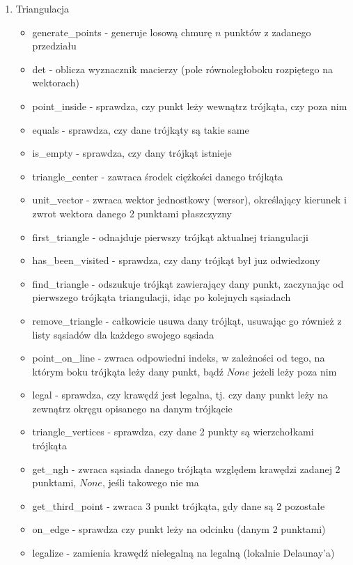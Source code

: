 \documentclass{article}
\begin{document}
\begin{enumerate}
    \item Triangulacja
    \begin{itemize}
        \item generate\_points - generuje losową chmurę $n$ punktów z zadanego przedziału
        \item det - oblicza wyznacznik macierzy (pole równoległoboku rozpiętego na wektorach)
        \item point\_inside - sprawdza, czy punkt leży wewnątrz trójkąta, czy poza nim 
        \item equals - sprawdza, czy dane trójkąty są takie same
        \item is\_empty - sprawdza, czy dany trójkąt istnieje
        \item triangle\_center - zawraca środek ciężkości danego trójkąta
        \item unit\_vector - zwraca wektor jednostkowy (wersor), określający kierunek i zwrot wektora danego 2 punktami płaszczyzny
        \item first\_triangle - odnajduje pierwszy trójkąt aktualnej triangulacji
        \item has\_been\_visited - sprawdza, czy dany trójkąt był juz odwiedzony
        \item find\_triangle - odszukuje trójkąt zawierający dany punkt, zaczynając od pierwszego trójkąta triangulacji, idąc po kolejnych sąsiadach
        \item remove\_triangle - całkowicie usuwa dany trójkąt, usuwając go również z listy sąsiadów dla każdego swojego sąsiada
        \item point\_on\_line - zwraca odpowiedni indeks, w zależności od tego, na którym boku trójkąta leży dany punkt, bądź $None$ jeżeli leży poza nim
        \item legal - sprawdza, czy krawędź jest legalna, tj. czy dany punkt leży na zewnątrz okręgu opisanego na danym trójkącie 
        \item triangle\_vertices - sprawdza, czy dane 2 punkty są wierzchołkami trójkąta
        \item get\_ngh - zwraca sąsiada danego trójkąta względem krawędzi zadanej 2 punktami, $None$, jeśli takowego nie ma
        \item get\_third\_point - zwraca 3 punkt trójkąta, gdy dane są 2 pozostałe
        \item on\_edge - sprawdza czy punkt leży na odcinku (danym 2 punktami)
        \item legalize - zamienia krawędź nielegalną na legalną (lokalnie Delaunay'a)

\end{itemize}
\end{enumerate}
\end{document}
